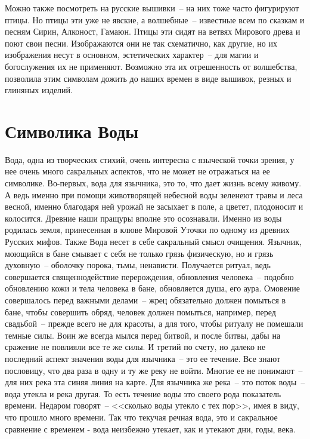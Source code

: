 \documentclass[pscyr,titlepage,chapters]{hedreport}
\begin{document}
  Можно также посмотреть на русские вышивки~-- на них тоже часто фигурируют
  птицы. Но птицы эти уже не явские, а волшебные~-- известные всем по сказкам и
  песням Сирин, Алконост, Гамаюн. Птицы эти сидят на ветвях Мирового древа и
  поют свои песни. Изображаются они не так схематично, как другие, но их
  изображения несут в основном, эстетических характер~-- для магии и
  богослужения их не применяют. Возможно эта их отрешенность от волшебства,
  позволила этим символам дожить до наших времен в виде вышивок, резных и
  глиняных изделий.

  \chapter{Символика Воды}
  
  Вода, одна из творческих стихий, очень интересна с языческой точки зрения, у
  нее очень много сакральных аспектов, что не может не отражаться на ее
  символике. Во-первых, вода для язычника, это то, что дает жизнь всему
  живому. А ведь именно при помощи животворящей небесной воды зеленеют травы и
  леса весной, именно благодаря ней урожай не засыхает в поле, а цветет,
  плодоносит и колосится. Древние наши пращуры вполне это осознавали.
  Именно из воды родилась земля, принесенная в клюве Мировой Уточки по
  одному из древних Русских мифов. Также Вода несет в себе сакральный смысл
  очищения. Язычник, моющийся в бане смывает с себя не только грязь физическую,
  но и грязь духовную~-- оболочку порока, тьмы, ненависти. Получается ритуал,
  ведь совершается священнодействие перерождения, обновления человека~-- подобно
  обновлению кожи и тела человека в бане, обновляется душа, его аура. Омовение
  совершалось перед важными делами~-- жрец обязательно должен помыться в бане,
  чтобы совершить обряд, человек должен помыться, например, перед свадьбой~--
  прежде всего не для красоты, а для того, чтобы ритуалу не помешали темные
  силы. Воин же всегда мылся перед битвой, и после битвы, дабы на сражение не
  повлияли все те же силы. И третий по счету, но далеко не последний аспект
  значения воды для язычника~-- это ее течение. Все знают пословицу, что два
  раза в одну и ту же реку не войти. Многие ее не понимают~-- для них река эта
  синяя линия на карте. Для язычника же река~-- это поток воды~-- вода утекла и
  река другая. То есть течение воды это своего рода показатель времени. Недаром
  говорят~-- <<сколько воды утекло с тех пор>>, имея в виду, что прошло много
  времени. Так что текучая речная вода, это и сакральное сравнение с временем -
  вода неизбежно утекает, как и утекают дни, годы, века.
\end{document}
